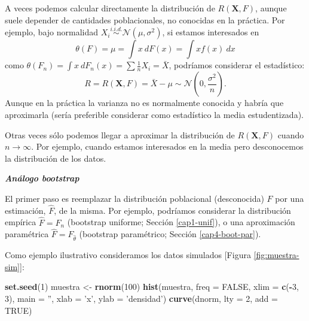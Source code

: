 \documentclass[
]{book}
\newenvironment{Shaded}{\begin{snugshade}}{\end{snugshade}}
\newcommand{\DataTypeTok}[1]{\textcolor[rgb]{0.13,0.29,0.53}{#1}}
\newcommand{\DecValTok}[1]{\textcolor[rgb]{0.00,0.00,0.81}{#1}}
\newcommand{\KeywordTok}[1]{\textcolor[rgb]{0.13,0.29,0.53}{\textbf{#1}}}
\newcommand{\NormalTok}[1]{#1}
\newcommand{\OperatorTok}[1]{\textcolor[rgb]{0.81,0.36,0.00}{\textbf{#1}}}
\newcommand{\OtherTok}[1]{\textcolor[rgb]{0.56,0.35,0.01}{#1}}
\newcommand{\StringTok}[1]{\textcolor[rgb]{0.31,0.60,0.02}{#1}}
\theoremstyle{definition}
\theoremstyle{definition}
\theoremstyle{definition}
\theoremstyle{remark}
\begin{document}
A veces podemos calcular directamente la distribución de \(R\left( \mathbf{X},F \right)\),
aunque suele depender de cantidades poblacionales,
no conocidas en la práctica.
Por ejemplo, bajo normalidad \(X_i \overset{i.i.d.}{\sim} \mathcal{N}\left( \mu ,\sigma^2 \right)\), si estamos interesados en
\[\theta \left( F \right) =\mu =\int x~dF\left( x \right) =\int xf\left( x \right) ~dx\]
como \(\theta \left( F_n \right) = \int x~dF_n\left( x \right) = \sum \frac{1}{n}X_i = \bar{X}\), podríamos considerar el estadístico:
\[R=R\left( \mathbf{X},F \right) = \bar{X} - \mu \sim \mathcal{N}\left( 0 ,\frac{\sigma^2}{n} \right).\]
Aunque en la práctica la varianza no es normalmente conocida y habría que aproximarla
(sería preferible considerar como estadístico la media estudentizada).

Otras veces sólo podemos llegar a aproximar la distribución de
\(R\left( \mathbf{X},F \right)\) cuando \(n \rightarrow \infty\).
Por ejemplo, cuando estamos interesados en la media pero desconocemos la
distribución de los datos.

\textbf{\emph{Análogo bootstrap}}

El primer paso es reemplazar la distribución poblacional (desconocida) \(F\) por una
estimación, \(\hat{F}\), de la misma. Por ejemplo, podríamos considerar la
distribución empírica \(\hat{F}=F_n\) (bootstrap uniforme; Sección \ref{cap1-unif}),
o una aproximación paramétrica \(\hat{F}=F_{\hat \theta}\) (bootstrap paramétrico; Sección \ref{cap4-boot-par}).

Como ejemplo ilustrativo consideramos los datos simulados {[}Figura \ref{fig:muestra-sim}{]}:

\begin{Shaded}
\begin{Highlighting}[]
\KeywordTok{set.seed}\NormalTok{(}\DecValTok{1}\NormalTok{)}
\NormalTok{muestra <-}\StringTok{ }\KeywordTok{rnorm}\NormalTok{(}\DecValTok{100}\NormalTok{)}
\KeywordTok{hist}\NormalTok{(muestra, }\DataTypeTok{freq =} \OtherTok{FALSE}\NormalTok{, }\DataTypeTok{xlim =} \KeywordTok{c}\NormalTok{(}\OperatorTok{-}\DecValTok{3}\NormalTok{, }\DecValTok{3}\NormalTok{),}
     \DataTypeTok{main =} \StringTok{''}\NormalTok{, }\DataTypeTok{xlab =} \StringTok{'x'}\NormalTok{, }\DataTypeTok{ylab =} \StringTok{'densidad'}\NormalTok{)}
\KeywordTok{curve}\NormalTok{(dnorm, }\DataTypeTok{lty =} \DecValTok{2}\NormalTok{, }\DataTypeTok{add =} \OtherTok{TRUE}\NormalTok{)}
\end{Highlighting}
\end{Shaded}
\end{document}
